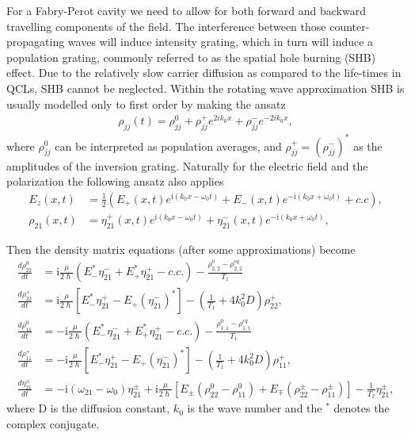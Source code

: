 \documentclass[preprint,secnumarabic,amssymb, nobibnotes, aip, prd]{revtex4-1}
\begin{document}
For a Fabry-Perot cavity we need to allow for both forward and backward travelling components of the field. The interference between those counter-propagating waves will induce intensity grating, which in turn will induce a population grating, commonly referred to as the spatial hole burning (SHB) effect. Due to the relatively slow carrier diffusion as compared to the life-times in QCLs, SHB cannot be neglected. Within the rotating wave approximation SHB is usually modelled only to first order by making the ansatz 
\begin{align}
\rho_{jj}(t) = \rho_{jj}^{0} + \rho_{jj}^{+}e^{2ik_0x}+\rho_{jj}^{-}e^{-2ik_0x}, 
\end{align}
where $\rho_{jj}^{0}$ can be interpreted as population averages, and $\rho_{jj}^{+}=(\rho_{jj}^{-})^{\ast}$ as the amplitudes of the inversion grating. Naturally for the electric field and the polarization the following ansatz also applies 
\begin{align}
E_{z}(x,t) &=\frac{1}{2}\left( E_{+}(x,t)e^{\mathrm{i}(k_{0}x-\omega_{0}t)} +E_{-}(x,t)e^{-\mathrm{i}(k_{0}x+\omega_{0}t)}  +c.c\right)  , \label{eq:FPansatz-field} \\
\rho_{21}(x,t)  &  =\eta_{21}^{+}(x,t)e^{  \mathrm{i}(k_{0}x-\omega_{0}t)}  +\eta_{21}^{-}(x,t)e^{-\mathrm{i}(k_{0}x+\omega_{0}t)}  ,\label{eq:21ansatz}
\end{align}

Then the density matrix equations (after some approximations) become 
\begin{align}
\frac{d\rho_{22}^{0}}{dt} &= \mathrm{i}\frac{\mu}{2\hslash}\left(  E_{-}^{\ast}\eta_{21}^{-}+E_{+}^{\ast}\eta_{21}^{+}-c.c.\right) -\frac{\rho_{2,2}^{0}-\rho_{2,2}^{eq}}{T_1} \\
\frac{d\rho_{22}^{+}}{dt} &= \mathrm{i}\frac{\mu}{2\hslash}\left[  E_{-}^{\ast}\eta_{21}^{+}-E_{+}(\eta_{21}^{-})^{\ast}\right] - \left( \frac{1}{T_1}+4k_{0}^{2}D\right)  \rho_{22}^{+},\label{eq:rtpop3grating}\\
\frac{d\rho_{11}^{0}}{dt} &=-\mathrm{i}\frac{\mu}{2\hslash}\left(E_{-}^{\ast}\eta_{21}^{-}+E_{+}^{\ast}\eta_{21}^{+}-c.c.\right) -\frac{\rho_{1,1}^{0}-\rho_{1,1}^{eq}}{T_1} \\
\frac{d\rho_{11}^{+}}{dt} &=-\mathrm{i}\frac{\mu}{2\hslash}\left[E_{-}^{\ast}\eta_{21}^{+}-E_{+}(\eta_{21}^{-})^{\ast}\right] -\left(  \frac{1}{T_1}+4k_{0}^{2}D\right) \rho_{11}^{+}, \label{eq:rtpop2grating} \\
\frac{d\eta_{21}^{\pm}}{dt} & = -\mathrm{i}\left(  \omega_{21}-\omega_{0}\right) \eta_{21}^{\pm}+\mathrm{i}\frac{\mu}{2\hslash}\left[  E_{\pm}(\rho_{22}^{0}-\rho_{11}^{0})+E_{\mp}(\rho_{22}^{\pm}-\rho_{11}^{\pm})\right]-\frac{1}{T_2}\eta_{21}^{\pm},
\end{align}
where D is the diffusion constant, $k_0$ is the wave number and the $^{\ast}$ denotes the complex conjugate.
\end{document}
